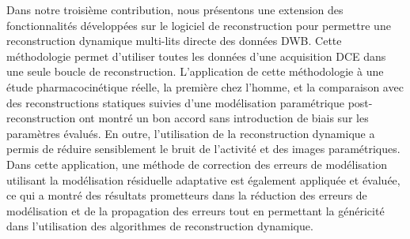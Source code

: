 Dans notre troisième contribution, nous présentons une extension des fonctionnalités développées sur le logiciel de reconstruction pour permettre une reconstruction dynamique multi-lits directe des données DWB. Cette méthodologie permet d'utiliser toutes les données d'une acquisition DCE dans une seule boucle de reconstruction. L'application de cette méthodologie à une étude pharmacocinétique réelle, la première chez l'homme, et la comparaison avec des reconstructions statiques suivies d'une modélisation paramétrique post-reconstruction ont montré un bon accord sans introduction de biais sur les paramètres évalués. En outre, l'utilisation de la reconstruction dynamique a permis de réduire sensiblement le bruit de l'activité et des images paramétriques. 
Dans cette application, une méthode de correction des erreurs de modélisation utilisant la modélisation résiduelle adaptative est également appliquée et évaluée, ce qui a montré des résultats prometteurs dans la réduction des erreurs de modélisation et de la propagation des erreurs tout en permettant la généricité dans l'utilisation des algorithmes de reconstruction dynamique.
